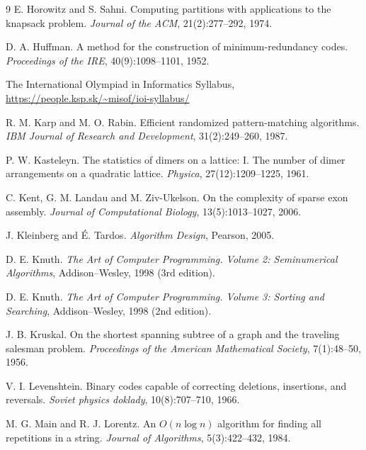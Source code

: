 \begin{thebibliography}{9}
  E. Horowitz and S. Sahni.
  Computing partitions with applications to the knapsack problem.
  \emph{Journal of the ACM}, 21(2):277--292, 1974.

  D. A. Huffman.
  A method for the construction of minimum-redundancy codes.
  \emph{Proceedings of the IRE}, 40(9):1098--1101, 1952.

  The International Olympiad in Informatics Syllabus,
  \url{https://people.ksp.sk/~misof/ioi-syllabus/}

  R. M. Karp and M. O. Rabin.
  Efficient randomized pattern-matching algorithms.
  \emph{IBM Journal of Research and Development}, 31(2):249--260, 1987.

  P. W. Kasteleyn.  
  The statistics of dimers on a lattice: I. The number of dimer arrangements on a quadratic lattice.
  \emph{Physica}, 27(12):1209--1225, 1961.

  C. Kent, G. M. Landau and M. Ziv-Ukelson.
  On the complexity of sparse exon assembly.
  \emph{Journal of Computational Biology}, 13(5):1013--1027, 2006.


  J. Kleinberg and É. Tardos.
  \emph{Algorithm Design}, Pearson, 2005.

  D. E. Knuth.
  \emph{The Art of Computer Programming. Volume 2: Seminumerical Algorithms}, Addison–Wesley, 1998 (3rd edition).

  D. E. Knuth.
  \emph{The Art of Computer Programming. Volume 3: Sorting and Searching}, Addison–Wesley, 1998 (2nd edition).


  J. B. Kruskal.
  On the shortest spanning subtree of a graph and the traveling salesman problem.
  \emph{Proceedings of the American Mathematical Society}, 7(1):48--50, 1956.

  V. I. Levenshtein.
  Binary codes capable of correcting deletions, insertions, and reversals.
  \emph{Soviet physics doklady}, 10(8):707--710, 1966.

  M. G. Main and R. J. Lorentz.
  An $O(n \log n)$ algorithm for finding all repetitions in a string.
  \emph{Journal of Algorithms}, 5(3):422--432, 1984.



\end{thebibliography}
